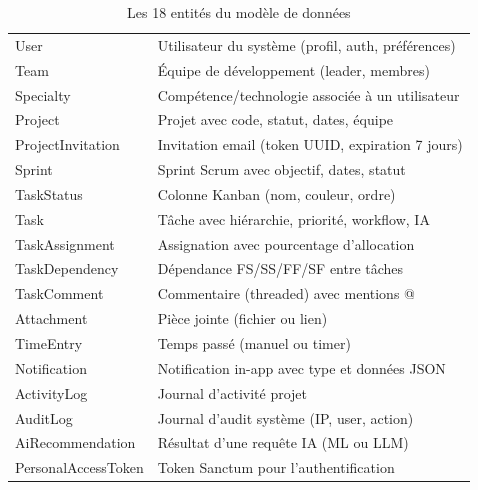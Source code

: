 \begin{table}[H]
  \centering
  \caption{Les 18 entités du modèle de données}
  \label{tab:entites}
  \begin{tabularx}{\textwidth}{L{4cm}X}
    \toprule
     &  \\
    \midrule
    User            & Utilisateur du système (profil, auth, préférences) \\
    Team            & Équipe de développement (leader, membres) \\
    Specialty       & Compétence/technologie associée à un utilisateur \\
    Project         & Projet avec code, statut, dates, équipe \\
    ProjectInvitation & Invitation email (token UUID, expiration 7 jours) \\
    Sprint          & Sprint Scrum avec objectif, dates, statut \\
    TaskStatus      & Colonne Kanban (nom, couleur, ordre) \\
    Task            & Tâche avec hiérarchie, priorité, workflow, IA \\
    TaskAssignment  & Assignation avec pourcentage d'allocation \\
    TaskDependency  & Dépendance FS/SS/FF/SF entre tâches \\
    TaskComment     & Commentaire (threaded) avec mentions @ \\
    Attachment      & Pièce jointe (fichier ou lien) \\
    TimeEntry       & Temps passé (manuel ou timer) \\
    Notification    & Notification in-app avec type et données JSON \\
    ActivityLog     & Journal d'activité projet \\
    AuditLog        & Journal d'audit système (IP, user, action) \\
    AiRecommendation & Résultat d'une requête IA (ML ou LLM) \\
    PersonalAccessToken & Token Sanctum pour l'authentification \\
    \bottomrule
  \end{tabularx}
\end{table}

